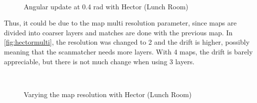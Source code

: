 \begin{figure}[t]
  \centering
   \quad
   \\
  \caption{Angular update at 0.4 rad with Hector (Lunch Room)}
  \label{fig:hector3an}
\end{figure}  

Thus, it could be due to the map multi resolution parameter, since maps are divided into coarser layers and matches are done with the previous map. In \autoref{fig:hectormulti}, the resolution was changed to 2 and the drift is higher, possibly meaning that the scanmatcher needs more layers. With 4 maps, the drift is barely appreciable, but there is not much change when using 3 layers.

\begin{figure}[h]
  \centering
   \quad
   \\
  \caption{Varying the map resolution with Hector (Lunch Room)}
  \label{fig:hectormulti}
\end{figure}  

